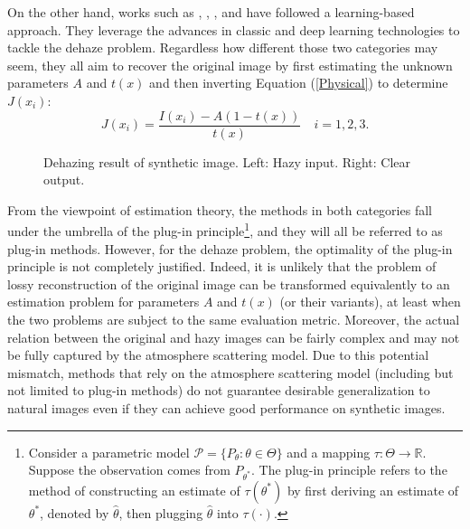 \documentclass[journal]{IEEEtran}
\begin{document}
On the other hand, works such as \cite{RandForstReg}, \cite{DehazeNet}, \cite{MultiScaleCNN}, and \cite{AllInOne} have followed a learning-based approach. They leverage the advances in classic and deep learning technologies to tackle the dehaze problem. Regardless how different those two categories may seem, they all aim to recover the original image by first estimating the unknown parameters $A$ and $t(x)$ and then inverting Equation (\ref{Physical}) to determine $J(x_{i})$:
\begin{equation}
J(x_{i})=\frac{I(x_{i})-A(1-t(x))}{t(x)}\quad i=1,2,3.
\end{equation}

\begin{figure}
	\subfigure{
		\texttt{[image: 1]}}
	\hspace{0in}
	\captionsetup{justification=centering}
	\centering\caption{Dehazing result of synthetic image. Left: Hazy input. Right: Clear output.}
\end{figure}

From the  viewpoint of estimation theory, the methods in both categories fall under the umbrella of the plug-in principle\footnote{Consider a parametric model $\mathcal{P}=\{P_{\theta}:\theta\in\Theta\}$ and a mapping $\tau:\Theta\rightarrow\mathbb{R}$. Suppose the observation comes from $P_{\theta^*}$. The plug-in principle refers to the method of constructing an estimate of $\tau(\theta^*)$ by first deriving an estimate of $\theta^*$, denoted by $\hat{\theta}$, then plugging $\hat{\theta}$ into $\tau(\cdot)$.}, and they will all be referred to as plug-in methods. 
However, for the dehaze problem, the optimality of the plug-in principle is not completely justified. Indeed, it is unlikely that the problem of lossy reconstruction of the original image can be transformed equivalently to an estimation problem for  parameters $A$ and $t(x)$ (or their variants), at least when the two problems are subject to the same evaluation metric. Moreover, the actual relation between the original and hazy images  can be fairly complex and may not be fully captured by the atmosphere scattering model. Due to this potential mismatch, methods that rely on the atmosphere scattering model (including but not limited to plug-in methods) do not guarantee desirable generalization to natural images even if they can achieve good performance on synthetic images.


\end{document}
